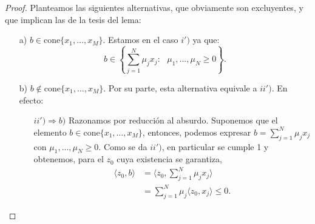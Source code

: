 \begin{proof}
	Planteamos las siguientes alternativas, que obviamente son excluyentes, y que implican las de la tesis del lema:
	\begin{itemize}
		\item[a)] $b \in \mathrm{cone}\{x_1,\dots, x_M \} $. Estamos en el caso $ i') $  ya que:
		\[
		b \in \left\lbrace \sum_{j=1}^{N}{\mu_j x_j } : \text{ } \mu_1,...,\mu_N \geq 0 \right\rbrace .
		\]
		\item[b)] $ b \notin \mathrm{cone}\{x_1,\dots, x_M \} $. Por su parte, esta alternativa equivale a $ ii') $. En efecto: 
		
		\begin{itemize}
			\item[$ ii') \Longrightarrow b) $] Razonamos por reducción al absurdo. Suponemos que el elemento $ b \in \mathrm{cone}\{x_1,\dots, x_M \} $, entonces, podemos expresar $ b =  \sum_{j=1}^{N}{\mu_j x_j } $ con $ \mu_1,...,\mu_N \geq 0$. Como se da $ ii') $, en particular se cumple 1 y obtenemos, para el $ z_0 $ cuya existencia se garantiza,
			\begin{equation*}
			\begin{split}
			\langle z_0, b \rangle & = \langle z_0, \sum_{j=1}^{N}{\mu_j x_j } \rangle \\
			&= \sum_{j=1}^{N}{\mu_j\langle z_0, x_j \rangle } \leq 0.
			\end{split}
			\end{equation*}
			

\end{itemize}
\end{itemize}
\end{proof}
